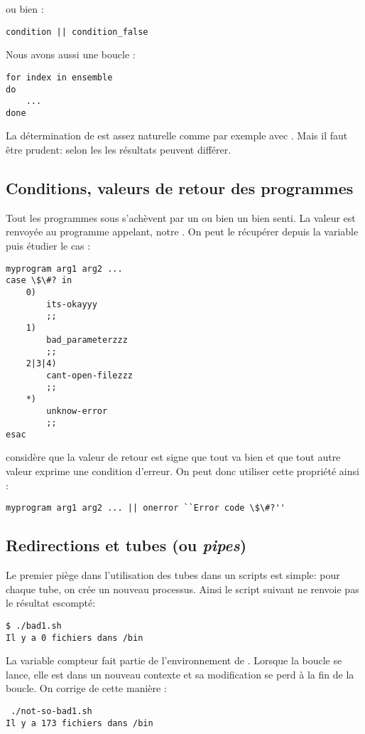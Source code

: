 ou bien :
\begin{lstlisting}
condition || condition_false
\end{lstlisting}

Nous avons aussi une boucle  :
\begin{lstlisting}
for index in ensemble
do
	...
done
\end{lstlisting}

La détermination de  est assez naturelle comme par exemple avec . Mais il faut être prudent: selon les \shells les résultats peuvent différer.

\subsection{Conditions, valeurs de retour des programmes}

Tout les programmes sous \unix s'achèvent par un  ou bien un  bien senti. La valeur  est renvoyée au programme appelant, notre \shell. On peut le récupérer depuis la variable  puis étudier le cas :
\begin{lstlisting}
myprogram arg1 arg2 ...
case \$\#? in
	0)
		its-okayyy
		;;
	1)
		bad_parameterzzz
		;;
	2|3|4)
		cant-open-filezzz
		;;
	*)
		unknow-error
		;;
esac
\end{lstlisting}

\unix considère que la valeur de retour  est signe que tout va bien et que tout autre valeur exprime une condition d'erreur. On peut donc utiliser cette propriété ainsi :

\begin{lstlisting}
myprogram arg1 arg2 ... || onerror ``Error code \$\#?''
\end{lstlisting}

\subsection{Redirections et tubes (ou \emph{pipes})}
Le premier piège dans l'utilisation des tubes dans un scripts est simple: pour chaque tube, on crée un nouveau processus. Ainsi le script suivant ne renvoie pas le résultat escompté:



\begin{lstlisting}
$ ./bad1.sh
Il y a 0 fichiers dans /bin
\end{lstlisting}

La variable compteur fait partie de l'environnement de . Lorsque la boucle  se lance, elle est dans un nouveau contexte et sa modification se perd à la fin de la boucle. On corrige de cette manière :



\begin{lstlisting}
 ./not-so-bad1.sh
Il y a 173 fichiers dans /bin
\end{lstlisting}
